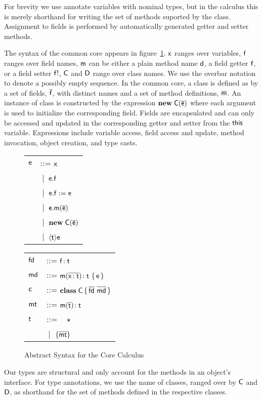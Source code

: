 \documentclass[preprint]{sigplanconf}
\newcommand{\fd}{\M{\xt{fd}}}
\newcommand{\md}{\M{\xt{md}}}
\newcommand{\mt}{\M{\xt{mt}}}
\newcommand{\m}{\M{\xt{m}}}
\newcommand{\e}{\M{\xt{e}}}
\renewcommand{\d}{\M{\xt{d}}}
\newcommand{\f}{\M{\xt{f}}}
\newcommand{\fb}{\M{\xt{f!}}}
\newcommand{\x}{\M{\xt{x}}}
\renewcommand{\t}{\M{\xt{t}}}
\renewcommand{\c}{\M{\xt{c}}}
\newcommand{\C}{\M{\xt{C}}}
\newcommand{\D}{\M{\xt{D}}}
\newcommand{\this}{\M{\xt{this}}}
\renewcommand{\d}{\M{\xt{d}}}
\newcommand{\new}{\M{\bt{new}}}
\newcommand{\Get}[2]{\M{#1.#2}}
\newcommand{\Set}[3]{\M{#1.#2:=#3}}
\newcommand{\Call}[3]{\M{#1.#2(#3)}}
\newcommand{\New}[2]{\M{\new\;#1({#2})}}
\newcommand{\Cast}[2]{\M{\langle{#1}\rangle{#2}}}
\newcommand{\any}{\M{\star}}
\newcommand{\Type}[1]{\M{\{ #1 \}}}
\newcommand{\HT}[2]{\M{{#1}\!:{#2}}}
\newcommand{\Mdef}[5]{\M{ \HT { #1( \b{\HT{#2}{#3}})}{#4}~ \{\, {#5} \,\} }}
\newcommand{\Ftype}[2]{\M{ \HT{#1}{#2} }}
\newcommand{\Mtype}[3]{\M{ \HT { #1( #2 )}{#3}}}
\newcommand{\Class}[3]{\M{\bt{class}\;#1\,\{\, #2 ~ #3\, \}}}
\newcommand{\Alt}[1]{ &\B #1 \\}
\newcommand{\B}{\M{~|~}}
\newcommand{\M}[1]{\ensuremath{#1}\xspace}
\newcommand{\xt}[1]{{\sf{#1}}\xspace}
\newcommand{\bt}[1]{\xt{\bf #1}}
\renewcommand{\b}[1]{\M{\overline{#1}}}
\begin{document}
For brevity we use annotate variables with nominal types, but in the
calculus this is merely shorthand for writing the set of methods suported 
by the class. Assignment to fields is performed by automatically generated
getter and setter methods.

The syntax of the common core appears in figure~\ref{syn}.  \x ranges
over variables, \f ranges over field names, \m can be either a plain method
name \d, a field getter \f, or a field setter \fb, \C and \D range over
class names. We use the overbar notation to denote a possibly empty
sequence. In the common core, a class is defined as by a set of fields,
\b\f, with distinct names and a set of method definitions, \b\m. An instance
of class is constructed by the expression \New\C{\b\e} where each argument
is used to initialize the corresponding field. Fields are encapsulated and
can only be accessed and updated in the corresponding getter and setter from
the \this variable.  Expressions include variable access, field access and
update, method invocation, object creation, and type casts.



\begin{figure}[!h]\center\begin{minipage}{4cm}\begin{tabular}{l@{~~~}l}
\e &::=  \x \\
   \Alt{ \Get\e\f }
   \Alt{ \Set\e\f\e }
   \Alt{ \Call\e\m{\b\e} }
   \Alt{ \New\C{\b\e} }
   \Alt{ \Cast\t\e }
\end{tabular}\end{minipage}\begin{minipage}{4cm}\begin{tabular}{l@{~~~}l}
\fd &::= 
    \Ftype\f\t   \\
\md &::=
    \Mdef\m\x\t\t\e \\
\c &::= \Class \C {\b{\fd}}{\b{\md} } \\
\mt &::= \Mtype\m{\b\t}\t\\
\t &::= ~ \any \\
   \Alt{ \Type{  \b{ \mt } } }
\end{tabular}\end{minipage}
\caption{Abstract Syntax for the Core Calculus}\label{syn}
\end{figure}

Our types are structural and only account for the methods in an object's
interface. For type annotations, we use the name of classes, ranged over by
\C and \D, as shorthand for the set of methods defined in the respective
classes.
\end{document}

